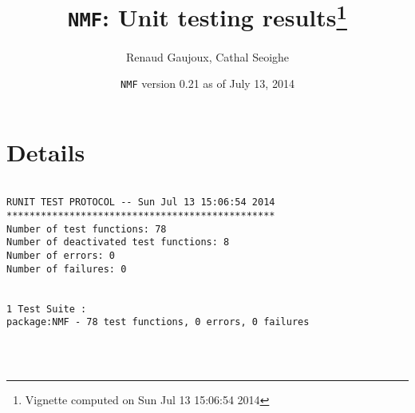 \documentclass[10pt]{article}\usepackage[]{graphicx}\usepackage[]{color}
\author{Renaud Gaujoux, Cathal Seoighe}
\title{\texttt{NMF}: Unit testing results\footnote{Vignette computed  on Sun Jul 13 15:06:54 2014}}
\date{\texttt{NMF} version 0.21 as of July 13, 2014}
\begin{document}
\maketitle

\section{Details}
\begin{verbatim}

RUNIT TEST PROTOCOL -- Sun Jul 13 15:06:54 2014 
*********************************************** 
Number of test functions: 78 
Number of deactivated test functions: 8 
Number of errors: 0 
Number of failures: 0 

 
1 Test Suite : 
package:NMF - 78 test functions, 0 errors, 0 failures




\end{verbatim}
\end{document}
